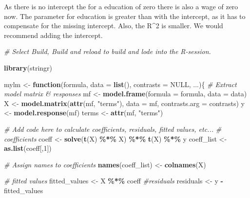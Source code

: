 \documentclass[
]{article}
\newenvironment{Shaded}{\begin{snugshade}}{\end{snugshade}}
\newcommand{\AttributeTok}[1]{\textcolor[rgb]{0.13,0.29,0.53}{#1}}
\newcommand{\CommentTok}[1]{\textcolor[rgb]{0.56,0.35,0.01}{\textit{#1}}}
\newcommand{\ConstantTok}[1]{\textcolor[rgb]{0.56,0.35,0.01}{#1}}
\newcommand{\ControlFlowTok}[1]{\textcolor[rgb]{0.13,0.29,0.53}{\textbf{#1}}}
\newcommand{\DecValTok}[1]{\textcolor[rgb]{0.00,0.00,0.81}{#1}}
\newcommand{\FunctionTok}[1]{\textcolor[rgb]{0.13,0.29,0.53}{\textbf{#1}}}
\newcommand{\NormalTok}[1]{#1}
\newcommand{\OtherTok}[1]{\textcolor[rgb]{0.56,0.35,0.01}{#1}}
\newcommand{\SpecialCharTok}[1]{\textcolor[rgb]{0.81,0.36,0.00}{\textbf{#1}}}
\newcommand{\StringTok}[1]{\textcolor[rgb]{0.31,0.60,0.02}{#1}}
\begin{document}
As there is no intercept the for a education of zero there is also a
wage of zero now. The parameter for education is greater than with the
intercept, as it has to compensate for the missing intercept. Also, the
R\^{}2 is smaller. We would recommend adding the intercept.

\begin{Shaded}
\begin{Highlighting}[]
\CommentTok{\# Select Build, Build and reload to build and lode into the R{-}session.}

\FunctionTok{library}\NormalTok{(stringr)}

\NormalTok{mylm }\OtherTok{\textless{}{-}} \ControlFlowTok{function}\NormalTok{(formula, }\AttributeTok{data =} \FunctionTok{list}\NormalTok{(), }\AttributeTok{contrasts =} \ConstantTok{NULL}\NormalTok{, ...)\{}
  \CommentTok{\# Extract model matrix \& responses}
\NormalTok{  mf }\OtherTok{\textless{}{-}} \FunctionTok{model.frame}\NormalTok{(}\AttributeTok{formula =}\NormalTok{ formula, }\AttributeTok{data =}\NormalTok{ data)}
\NormalTok{  X  }\OtherTok{\textless{}{-}} \FunctionTok{model.matrix}\NormalTok{(}\FunctionTok{attr}\NormalTok{(mf, }\StringTok{"terms"}\NormalTok{), }\AttributeTok{data =}\NormalTok{ mf, }\AttributeTok{contrasts.arg =}\NormalTok{ contrasts)}
\NormalTok{  y  }\OtherTok{\textless{}{-}} \FunctionTok{model.response}\NormalTok{(mf)}
\NormalTok{  terms }\OtherTok{\textless{}{-}} \FunctionTok{attr}\NormalTok{(mf, }\StringTok{"terms"}\NormalTok{)}


  \CommentTok{\# Add code here to calculate coefficients, residuals, fitted values, etc...}
  \CommentTok{\# coefficients}
\NormalTok{  coeff }\OtherTok{\textless{}{-}} \FunctionTok{solve}\NormalTok{(}\FunctionTok{t}\NormalTok{(X) }\SpecialCharTok{\%*\%}\NormalTok{ X) }\SpecialCharTok{\%*\%} \FunctionTok{t}\NormalTok{(X) }\SpecialCharTok{\%*\%}\NormalTok{ y}
\NormalTok{  coeff\_list }\OtherTok{\textless{}{-}} \FunctionTok{as.list}\NormalTok{(coeff[,}\DecValTok{1}\NormalTok{])}

  \CommentTok{\# Assign names to coefficients}
  \FunctionTok{names}\NormalTok{(coeff\_list) }\OtherTok{\textless{}{-}} \FunctionTok{colnames}\NormalTok{(X)}

  \CommentTok{\# fitted values}
\NormalTok{  fitted\_values }\OtherTok{\textless{}{-}}\NormalTok{ X }\SpecialCharTok{\%*\%}\NormalTok{ coeff}
  \CommentTok{\#residuals}
\NormalTok{  residuals }\OtherTok{\textless{}{-}}\NormalTok{ y }\SpecialCharTok{{-}}\NormalTok{ fitted\_values}



\end{Highlighting}
\end{Shaded}
\end{document}
